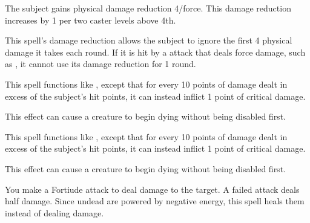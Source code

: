 \spellrng{\rngclose}
\spelldur{\durshort}
\begin{spelleffect}
  The subject gains physical damage reduction 4/force. This damage reduction increases by 1 per two caster levels above 4th.
\end{spelleffect}
\begin{spellnotes}
  This spell's damage reduction allows the subject to ignore the first 4 physical damage it takes each round. If it is hit by a attack that deals force damage, such as , it cannot use its damage reduction for 1 round.
\end{spellnotes}

\begin{spelleffect}
  This spell functions like , except that for every 10 points of damage dealt in excess of the subject's hit points, it can instead inflict 1 point of critical damage.
\end{spelleffect}
\begin{spellnotes}
  This effect can cause a creature to begin dying without being disabled first.
\end{spellnotes}

\begin{spelleffect}
  This spell functions like , except that for every 10 points of damage dealt in excess of the subject's hit points, it can instead inflict 1 point of critical damage.
\end{spelleffect}
\begin{spellnotes}
  This effect can cause a creature to begin dying without being disabled first.
\end{spellnotes}

\spellrng{\rngclose}
\begin{spelleffect}
    You make a Fortiude attack to deal damage to the target. A failed attack deals half damage. Since undead are powered by negative energy, this spell heals them instead of dealing damage.
\end{spelleffect}

